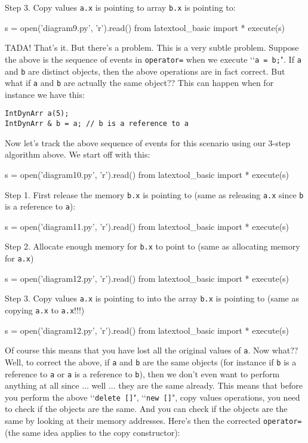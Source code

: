 Step 3.
Copy values \verb!a.x! is pointing to array
\verb!b.x! is pointing to:
\begin{python}
s = open('diagram9.py', 'r').read()
from latextool_basic import *
execute(s)
\end{python}

TADA! That's it. But there's a problem.
This is a very subtle problem. 
Suppose the above is the sequence of events in \verb!operator=! when 
we execute \lq\lq \verb!a = b;!".
If \verb!a! and \verb!b! are distinct 
objects, then the above operations are in fact correct. 
But what if \verb!a! and \verb!b!
are actually the same object?? This can happen when 
for instance we have this:

\begin{Verbatim}[frame=single]
IntDynArr a(5);
IntDynArr & b = a; // b is a reference to a
\end{Verbatim}

Now let's track the above sequence of events for this
scenario using our 3-step algorithm above.
We start off with this:
\begin{python}
s = open('diagram10.py', 'r').read()
from latextool_basic import *
execute(s)
\end{python}

Step 1.
First release the memory \verb!b.x! is pointing to
(same as releasing \verb!a.x! since \verb!b!
is a reference to \verb!a!):
\begin{python}
s = open('diagram11.py', 'r').read()
from latextool_basic import *
execute(s)
\end{python}

Step 2.
Allocate enough memory for \verb!b.x! to point to (same as allocating 
memory for \verb!a.x!) 
\begin{python}
s = open('diagram12.py', 'r').read()
from latextool_basic import *
execute(s)
\end{python}

Step 3.
Copy values \verb!a.x! is pointing to into the array \verb!b.x! is pointing to 
(same as copying \verb!a.x! to \verb!a.x!!!!) 
\begin{python}
s = open('diagram12.py', 'r').read()
from latextool_basic import *
execute(s)
\end{python}

Of course this means that you have lost all
the original values of \verb!a!.
Now what?? Well, to correct the above,
if \verb!a! and \verb!b! are the same objects
(for instance if
\verb!b! is a reference to \verb!a! or \verb!a!
is a reference to \verb!b!), 
then we don't even want to perform anything at all since
... well ... they are 
the same already.
This means that before you perform the above
\lq\lq\verb!delete []!", 
\lq\lq\verb!new []!", copy values operations,
you need to check if the objects are the same. 
And you can check if the objects are the same
by looking at their memory 
addresses.
Here's then the corrected \verb!operator=! (the same idea 
applies to the copy constructor):

